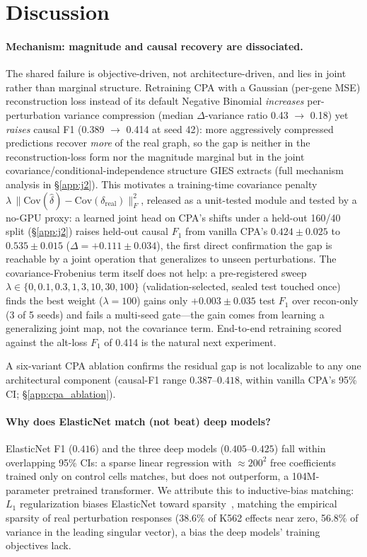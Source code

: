 \documentclass{article}
\theoremstyle{plain}
\theoremstyle{definition}
\theoremstyle{remark}
\begin{document}
\section{Discussion}
\label{sec:discussion}

\paragraph{Mechanism: magnitude and causal recovery are dissociated.}
The shared failure is objective-driven, not architecture-driven, and lies in joint rather than marginal structure. Retraining CPA with a Gaussian (per-gene MSE) reconstruction loss instead of its default Negative Binomial \emph{increases} per-perturbation variance compression (median $\Delta$-variance ratio 0.43 $\to$ 0.18) yet \emph{raises} causal F1 (0.389 $\to$ 0.414 at seed 42): more aggressively compressed predictions recover \emph{more} of the real graph, so the gap is neither in the reconstruction-loss form nor the magnitude marginal but in the joint covariance/conditional-independence structure GIES extracts (full mechanism analysis in \S\ref{app:j2}). This motivates a training-time covariance penalty $\lambda\,\lVert \mathrm{Cov}(\hat\delta) - \mathrm{Cov}(\delta_{\text{real}})\rVert_F^2$, released as a unit-tested module and tested by a no-GPU proxy: a learned joint head on CPA's shifts under a held-out 160/40 split (\S\ref{app:j2}) raises held-out causal $F_1$ from vanilla CPA's $0.424 \pm 0.025$ to $0.535 \pm 0.015$ ($\Delta = +0.111 \pm 0.034$), the first direct confirmation the gap is reachable by a joint operation that generalizes to unseen perturbations. The covariance-Frobenius term itself does not help: a pre-registered sweep $\lambda\in\{0,0.1,0.3,1,3,10,30,100\}$ (validation-selected, sealed test touched once) finds the best weight ($\lambda{=}100$) gains only $+0.003 \pm 0.035$ test $F_1$ over recon-only (3 of 5 seeds) and fails a multi-seed gate---the gain comes from learning a generalizing joint map, not the covariance term. End-to-end retraining scored against the alt-loss $F_1$ of 0.414 is the natural next experiment.

A six-variant CPA ablation confirms the residual gap is not localizable to any one architectural component (causal-F1 range $0.387$--$0.418$, within vanilla CPA's 95\% CI; \S\ref{app:cpa_ablation}).

\paragraph{Why does ElasticNet match (not beat) deep models?}
ElasticNet F1 ($0.416$) and the three deep models ($0.405$--$0.425$) fall within overlapping 95\% CIs: a sparse linear regression with $\approx\!200^2$ free coefficients trained only on control cells matches, but does not outperform, a 104M-parameter pretrained transformer. We attribute this to inductive-bias matching: $L_1$ regularization biases ElasticNet toward sparsity~\citep{zou2005elasticnet}, matching the empirical sparsity of real perturbation responses (38.6\% of K562 effects near zero, 56.8\% of variance in the leading singular vector), a bias the deep models' training objectives lack.
\end{document}
